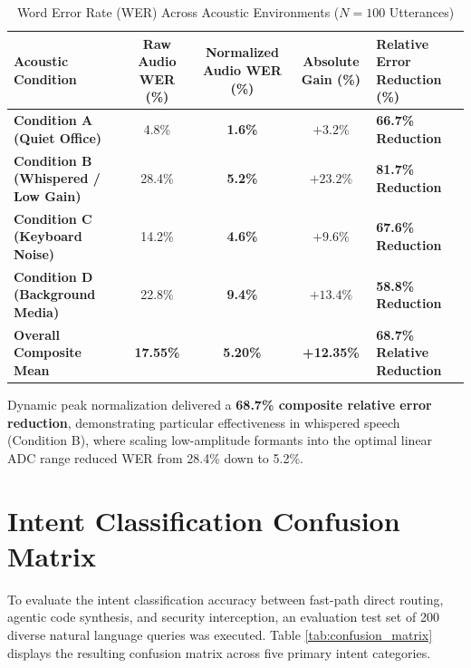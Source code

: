 \begin{table}[htbp]
\centering
\small
\caption{Word Error Rate (WER) Across Acoustic Environments ($N=100$ Utterances)}
\label{tab:wer_results}
\begin{tabularx}{\textwidth}{|p{4.2cm}|c|c|c|X|}
\hline
\textbf{Acoustic Condition} & \textbf{Raw Audio WER (\%)} & \textbf{Normalized Audio WER (\%)} & \textbf{Absolute Gain (\%)} & \textbf{Relative Error Reduction (\%)} \\ \hline
\textbf{Condition A (Quiet Office)} & 4.8\% & \textbf{1.6\%} & $+3.2\%$ & \textbf{66.7\% Reduction} \\ \hline
\textbf{Condition B (Whispered / Low Gain)} & 28.4\% & \textbf{5.2\%} & $+23.2\%$ & \textbf{81.7\% Reduction} \\ \hline
\textbf{Condition C (Keyboard Noise)} & 14.2\% & \textbf{4.6\%} & $+9.6\%$ & \textbf{67.6\% Reduction} \\ \hline
\textbf{Condition D (Background Media)} & 22.8\% & \textbf{9.4\%} & $+13.4\%$ & \textbf{58.8\% Reduction} \\ \hline
\textbf{Overall Composite Mean} & \textbf{17.55\%} & \textbf{5.20\%} & \textbf{+12.35\%} & \textbf{68.7\% Relative Reduction} \\ \hline
\end{tabularx}
\end{table}

Dynamic peak normalization delivered a \textbf{68.7\% composite relative error reduction}, demonstrating particular effectiveness in whispered speech (Condition B), where scaling low-amplitude formants into the optimal linear ADC range reduced WER from 28.4\% down to 5.2\%.

\section{Intent Classification Confusion Matrix}
To evaluate the intent classification accuracy between fast-path direct routing, agentic code synthesis, and security interception, an evaluation test set of 200 diverse natural language queries was executed. Table \ref{tab:confusion_matrix} displays the resulting confusion matrix across five primary intent categories.

